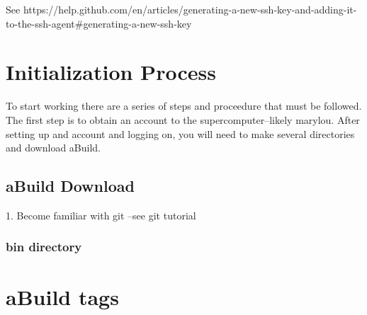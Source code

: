 \documentclass{article}
\begin{document}
See https://help.github.com/en/articles/generating-a-new-ssh-key-and-adding-it-to-the-ssh-agent\#generating-a-new-ssh-key

\section{Initialization Process}
To start working there are a series of steps and proceedure that must
be followed. The first step is to obtain an account to the supercomputer--likely
marylou. After setting up and account and logging on, you will need to
make several directories and download aBuild.  
\subsection{aBuild Download}
1. Become familiar with git --see git tutorial

\subsubsection{bin directory}




\section{aBuild tags} %

\end{document}
